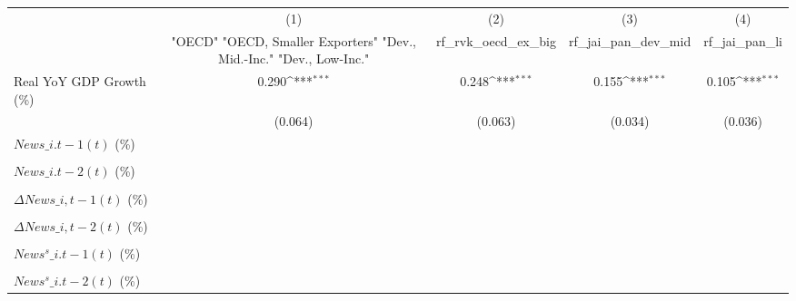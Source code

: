 {
\def\sym#1{\ifmmode^{#1}\else\(^{#1}\)\fi}
\begin{tabular}{l*{4}{c}}
\toprule
                    &\multicolumn{1}{c}{(1)}&\multicolumn{1}{c}{(2)}&\multicolumn{1}{c}{(3)}&\multicolumn{1}{c}{(4)}\\
                    &\multicolumn{1}{c}{ "OECD" "OECD, Smaller Exporters" "Dev., Mid.-Inc." "Dev., Low-Inc."}&\multicolumn{1}{c}{rf\_rvk\_oecd\_ex\_big}&\multicolumn{1}{c}{rf\_jai\_pan\_dev\_mid}&\multicolumn{1}{c}{rf\_jai\_pan\_li}\\
\midrule
Real YoY GDP Growth (\%)&       0.290\sym{***}&       0.248\sym{***}&       0.155\sym{***}&       0.105\sym{***}\\
                    &     (0.064)         &     (0.063)         &     (0.034)         &     (0.036)         \\
\addlinespace
$ News\_{i.t-1}(t)$ (\%)&                     &                     &                     &                     \\
                    &                     &                     &                     &                     \\
\addlinespace
$ News\_{i.t-2}(t)$ (\%)&                     &                     &                     &                     \\
                    &                     &                     &                     &                     \\
\addlinespace
$ \Delta News\_{i,t-1}(t)$ (\%)&                     &                     &                     &                     \\
                    &                     &                     &                     &                     \\
\addlinespace
$ \Delta News\_{i,t-2}(t)$ (\%)&                     &                     &                     &                     \\
                    &                     &                     &                     &                     \\
\addlinespace
$ News^s\_{i.t-1}(t)$ (\%)&                     &                     &                     &                     \\
                    &                     &                     &                     &                     \\
\addlinespace
$ News^s\_{i.t-2}(t)$ (\%)&                     &                     &                     &                     \\

\end{tabular}}
